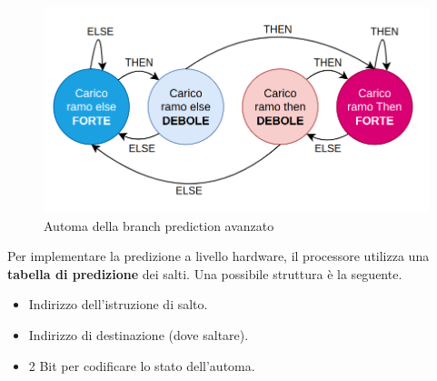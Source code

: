 \begin{figure}[ht]
    \centering
    \includegraphics[width=.5\textwidth]{img/automa-complesso.png}
    \caption{Automa della branch prediction avanzato}\label{img:automa-complesso}
\end{figure}

Per implementare la predizione a livello hardware, il processore utilizza una \textbf{tabella di predizione} dei salti. Una possibile struttura è la seguente.
\begin{itemize}
    \item Indirizzo dell'istruzione di salto.
    \item Indirizzo di destinazione (dove saltare).
    \item 2 Bit per codificare lo stato dell'automa.
\end{itemize}

